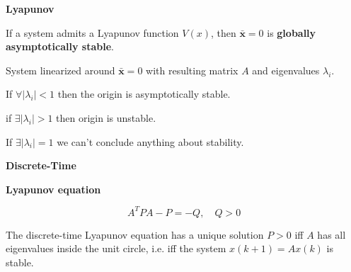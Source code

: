\begin{sstTitleBox}[Plum]{\center\textbf{\large
			Lyapunov
		}}
	\begin{sstOnlyFrame}[Plum]
		\begin{theorem}
			If a system admits a Lyapunov function $V(x)$,
			then $\bar{\mathbf{x}} = 0$ is
			\textbf{globally asymptotically stable}.
		\end{theorem}
	\end{sstOnlyFrame}


	\begin{sstOnlyFrame}[Plum]
		\begin{theorem}
			System linearized around $\bar{\mathbf{x}}=0$
			with resulting matrix $A$ and eigenvalues $\lambda_i$.

			If	$\forall |\lambda_i| < 1$
			then the origin is asymptotically stable.

			if $\exists |\lambda_i| > 1$
			then origin is unstable.

			If $\exists |\lambda_i| = 1$
			we can't conclude anything about stability.
		\end{theorem}
	\end{sstOnlyFrame}

	\begin{sstOnlyFrame}[Plum]
		\begin{minipage}[c]{0.34\linewidth}
			\textbf{Discrete-Time}

			\textbf{Lyapunov equation}
		\end{minipage}
		\begin{minipage}[b]{0.64\linewidth}
			\[A^TPA-P=-Q,\quad Q>0\]
		\end{minipage}
	\end{sstOnlyFrame}

	\begin{sstOnlyFrame}[Plum]
		\begin{theorem}
			The discrete-time Lyapunov equation has a unique solution
			$P > 0$ iff $A$ has all eigenvalues inside the unit circle,
			i.e. iff the system $x(k+1) = Ax(k)$ is stable.
		\end{theorem}
	\end{sstOnlyFrame}
\end{sstTitleBox}
